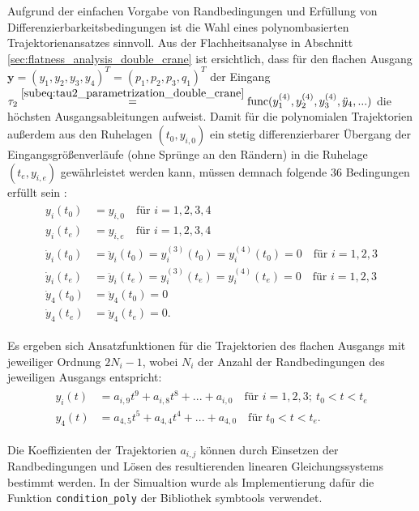 Aufgrund der einfachen Vorgabe von Randbedingungen und Erfüllung von Differenzierbarkeitsbedingungen ist die Wahl eines polynombasierten Trajektorienansatzes sinnvoll. Aus der Flachheitsanalyse in Abschnitt \ref{sec:flatness_analysis_double_crane} ist ersichtlich, dass für den flachen Ausgang ${\mathbf{y} = (y_1, y_2, y_3, y_4)^T = (p_1, p_2, p_3, q_1)^T}$ der Eingang $\tau_2 \stackrel{\eqref{subeq:tau2_parametrization_double_crane}}{=} \mathrm{func}(y_1^{(4)}, y_2^{(4)}, y_3^{(4)}, \ddot{y}_4, ...)$ die höchsten Ausgangsableitungen aufweist. Damit für die polynomialen Trajektorien außerdem aus den Ruhelagen $(t_0, y_{i, 0})$  ein stetig differenzierbarer Übergang der Eingangsgrößenverläufe (ohne Sprünge an den Rändern) in die Ruhelage $(t_e, y_{i, e})$ gewährleistet werden kann, müssen demnach folgende 36 Bedingungen erfüllt sein \cite[S.~230]{NLRT_Roebenack}:
\begin{align}
	\begin{split}
	y_i(t_0) &= y_{i, 0}  \quad \text{für } i = 1,2,3,4 \\
	y_i(t_e) &= y_{i, e}  \quad \text{für } i = 1,2,3,4 \\
	\dot{y}_i(t_0) &= \ddot{y}_i(t_0) = y_i^{(3)}(t_0) = y_i^{(4)}(t_0) = 0 \quad \text{für } i = 1,2,3 \\
	\dot{y}_i(t_e) &= \ddot{y}_i(t_e) = y_i^{(3)}(t_e) = y_i^{(4)}(t_e) = 0 \quad \text{für } i = 1,2,3 \\
	\dot{y}_4(t_0) &= \ddot{y}_4(t_0) = 0 \\
	\dot{y}_4(t_e) &= \ddot{y}_4(t_e) = 0.
	\end{split}
\end{align}

Es ergeben sich Ansatzfunktionen für die Trajektorien des flachen Ausgangs mit jeweiliger Ordnung $2 N_i - 1$, wobei $N_i$ der Anzahl der Randbedingungen des jeweiligen Ausgangs entspricht:
\begin{align}
	\label{eq:polynomes_ref_trajectories}
	\begin{split}
	y_i(t) &= a_{i, 9} t^9 + a_{i, 8} t^8 + ... + a_{i, 0} \quad \text{für }  i = 1,2,3; \ t_0 < t < t_e \\
	y_4(t) &= a_{4, 5} t^5 + a_{4, 4} t^4 + ... + a_{4, 0} \quad \text{für } t_0 < t < t_e.
	\end{split}
\end{align}

Die Koeffizienten der Trajektorien $a_{i, j}$ können durch Einsetzen der Randbedingungen und Lösen des resultierenden linearen Gleichungssystems bestimmt werden. In der Simualtion wurde als Implementierung dafür die Funktion \texttt{condition\_poly} der Bibliothek symbtools verwendet.



